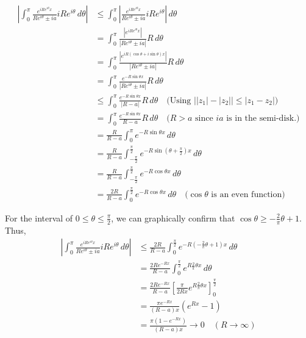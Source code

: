 \documentclass[letterpaper, 12pt]{article}
\theoremstyle{custom}
\begin{document}
\begin{align*}
  \left| \int_{0}^{\pi} \frac{e^{i Re^{i \theta} x}}{Re^{i \theta} \pm ia} iRe^{i \theta} \, d \theta \right|
  & \leq  \int_{0}^{\pi} \left| \frac{e^{i Re^{i \theta} x}}{Re^{i \theta} \pm ia} iRe^{i \theta} \right| \, d \theta \\
  & =     \int_{0}^{\pi} \frac{\left| e^{i Re^{i \theta} x}\right|}{\left| Re^{i \theta} \pm ia \right|} R \, d \theta \\
  & =     \int_{0}^{\pi} \frac{\left| e^{i R(\cos \theta + i \sin \theta) x}\right|}{\left| Re^{i \theta} \pm ia \right|} R \, d \theta \\
  & =     \int_{0}^{\pi} \frac{e^{- R\sin \theta x}}{\left| Re^{i \theta} \pm ia \right|} R \, d \theta \\
  & \leq  \int_{0}^{\pi} \frac{e^{- R\sin \theta x}}{\left| R - a \right|} R \, d \theta \quad \text{(Using $\left| \left|z_1\right| - \left|z_2\right| \right| \leq \left|z_1 - z_2\right|$)}\\
  & =     \int_{0}^{\pi} \frac{e^{- R\sin \theta x}}{R - a} R \, d \theta \quad \text{($R>a$ since $ia$ is in the semi-disk.)}\\
  & =     \frac{R}{R-a}\int_{0}^{\pi} e^{- R\sin \theta x} \, d \theta\\
  & =     \frac{R}{R-a}\int_{-\frac{\pi}{2}}^{\frac{\pi}{2}} e^{- R\sin \left( \theta+\frac{\pi}{2}\right) x} \, d \theta\\
  & =     \frac{R}{R-a}\int_{-\frac{\pi}{2}}^{\frac{\pi}{2}} e^{- R\cos \theta x} \, d \theta\\
  & =     \frac{2R}{R-a}\int_{0}^{\frac{\pi}{2}} e^{- R\cos \theta x} \, d \theta \quad \text{($\cos \theta$ is an even function)}
\end{align*}

For the interval of $0 \leq \theta \leq \displaystyle \frac{\pi}{2}$, we can graphically confirm that $\cos \theta \geq -\displaystyle \frac{2}{\pi} \theta + 1$.
Thus,
\begin{align*}
  \left| \int_{0}^{\pi} \frac{e^{i Re^{i \theta} x}}{Re^{i \theta} \pm ia} iRe^{i \theta} \, d \theta \right|
  & \leq  \frac{2R}{R-a}\int_{0}^{\frac{\pi}{2}} e^{- R \left( -\frac{2}{\pi}\theta + 1 \right) x} \, d \theta \\
  & =     \frac{2Re^{-Rx}}{R-a}\int_{0}^{\frac{\pi}{2}} e^{R\frac{2}{\pi}\theta x} \, d \theta \\
  & =     \frac{2Re^{-Rx}}{R-a}\left[ \frac{\pi}{2Rx}e^{R\frac{2}{\pi}\theta x} \right]_{0}^{\frac{\pi}{2}}\\
  & =     \frac{\pi e^{-Rx}}{\left(R-a\right) x}\left( e^{Rx} - 1 \right)\\
  & =     \frac{\pi \left( 1 - e^{-Rx} \right)}{\left(R-a\right) x} \rightarrow 0 \quad (R \rightarrow \infty)
\end{align*}
\end{document}
